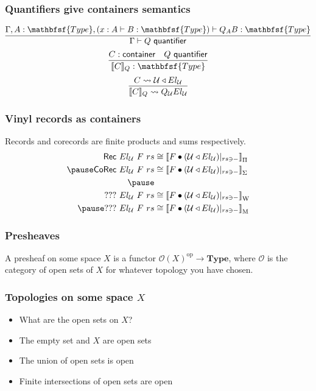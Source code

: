 \documentclass[tikz, 12pt]{beamer}
\def\Type{\mathbfsf{Type}}
\begin{document}
\begin{frame}
  \frametitle{Quantifiers give containers semantics}
  \[
    \infer{\Gamma\vdash Q\ \mathsf{quantifier}}{
      \Gamma,A:\Type, (x:A\vdash B:\Type) \vdash Q_AB:\Type
    }
  \]\pause
  \[
    \infer{\llbracket C\rrbracket_Q : \Type}{
      C : \container &
      Q\ \mathsf{quantifier}
    }
  \]\pause
  \[
    \infer{
      \llbracket C\rrbracket_Q \leadsto Q_\mathcal{U} El_\mathcal{U}
    }{
      C \leadsto \mkcon{\mathcal{U}}{El_\mathcal{U}}
    }
  \]
\end{frame}

\begin{frame}
  \frametitle{Vinyl records as containers}\pause
  Records and corecords are finite products and sums respectively.\pause
  \[
    \begin{aligned}
      \mathsf{Rec}\ El_\mathcal{U}\ F\ rs
      &\cong \left\llbracket F\bullet (\mkcon{\mathcal{U}}{El_\mathcal{U}})|_{rs\ni-}\right\rrbracket_\Pi\\ \pause
      \mathsf{CoRec}\ El_\mathcal{U}\ F\ rs
        &\cong \left\llbracket F\bullet(\mkcon{\mathcal{U}}{El_\mathcal{U}})|_{rs\ni-}\right\rrbracket_\Sigma\\ \pause
      \\
      ???\ El_\mathcal{U}\ F\ rs
        &\cong \left\llbracket F\bullet(\mkcon{\mathcal{U}}{El_\mathcal{U}})|_{rs\ni-} \right\rrbracket_\mathrm{W}\\ \pause
      ???\ El_\mathcal{U}\ F\ rs
        &\cong \left\llbracket F\bullet(\mkcon{\mathcal{U}}{El_\mathcal{U}})|_{rs\ni-}\right\rrbracket_\mathrm{M}
    \end{aligned}
  \]
\end{frame}

\begin{frame}
  \frametitle{Presheaves}\pause

  A presheaf on some space $X$ is a functor
  $\mathcal{O}(X)^{\mathrm{op}}\to\mathbf{Type}$, where $\mathcal{O}$ is the
  category of open sets of $X$ for whatever topology you have chosen.
\end{frame}

\begin{frame}
  \frametitle{Topologies on some space $X$}\pause

  \begin{itemize}
    \item What are the open sets on $X$?\pause
    \item The empty set and $X$ are open sets\pause
    \item The union of open sets is open\pause
    \item Finite intersections of open sets are open
  \end{itemize}
\end{frame}
\end{document}
